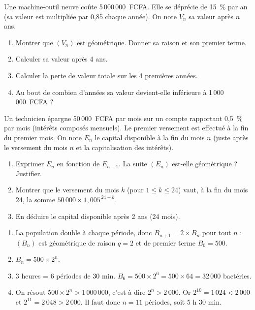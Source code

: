 \documentclass[11pt]{article}
\begin{document}
\begin{exercice}
Une machine-outil neuve coûte 5\,000\,000~FCFA. Elle se déprécie de 15~\% par an (sa valeur est multipliée par 0,85 chaque année). On note $V_n$ sa valeur après $n$ ans.
\begin{enumerate}
  \item Montrer que $(V_n)$ est géométrique. Donner sa raison et son premier terme.
  \item Calculer sa valeur après 4 ans.
  \item Calculer la perte de valeur totale sur les 4 premières années.
  \item Au bout de combien d'années sa valeur devient-elle inférieure à 1\,000\,000~FCFA ?
\end{enumerate}
\end{exercice}

\begin{exercice}
Un technicien épargne 50\,000~FCFA par mois sur un compte rapportant 0,5~\% par mois (intérêts composés mensuels). Le premier versement est effectué à la fin du premier mois. On note $E_n$ le capital disponible à la fin du mois $n$ (juste après le versement du mois $n$ et la capitalisation des intérêts).
\begin{enumerate}
  \item Exprimer $E_n$ en fonction de $E_{n-1}$. La suite $(E_n)$ est-elle géométrique ? Justifier.
  \item Montrer que le versement du mois $k$ (pour $1 \le k \le 24$) vaut, à la fin du mois 24, la somme $50\,000 \times 1,005^{\,24-k}$.
  \item En déduire le capital disponible après 2 ans (24 mois).
\end{enumerate}
\end{exercice}

\begin{corrige}[Exercice 1]
\begin{enumerate}
  \item La population double à chaque période, donc $B_{n+1} = 2 \times B_n$ pour tout $n$ : $(B_n)$ est géométrique de raison $q=2$ et de premier terme $B_0=500$.
  \item $B_n = 500 \times 2^n$.
  \item 3 heures = 6 périodes de 30 min. $B_6 = 500 \times 2^6 = 500 \times 64 = 32\,000$ bactéries.
  \item On résout $500 \times 2^n > 1\,000\,000$, c'est-à-dire $2^n > 2\,000$. Or $2^{10}=1\,024 < 2\,000$ et $2^{11}=2\,048 > 2\,000$. Il faut donc $n = 11$ périodes, soit 5 h 30 min.
\end{enumerate}
\end{corrige}
\end{document}
